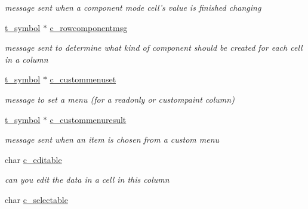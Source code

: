 \begin{DoxyCompactItemize}
\begin{DoxyCompactList}\small\item\em message sent when a component mode cell's value is finished changing \item\end{DoxyCompactList}\item 
\hypertarget{structt__jcolumn_a2c26706beed3f014c420fd774e685dc9}{
\hyperlink{structt__symbol}{t\_\-symbol} $\ast$ \hyperlink{structt__jcolumn_a2c26706beed3f014c420fd774e685dc9}{c\_\-rowcomponentmsg}}
\label{structt__jcolumn_a2c26706beed3f014c420fd774e685dc9}

\begin{DoxyCompactList}\small\item\em message sent to determine what kind of component should be created for each cell in a column \item\end{DoxyCompactList}\item 
\hypertarget{structt__jcolumn_a3650944393f3c4bdb9639866c490e46a}{
\hyperlink{structt__symbol}{t\_\-symbol} $\ast$ \hyperlink{structt__jcolumn_a3650944393f3c4bdb9639866c490e46a}{c\_\-custommenuset}}
\label{structt__jcolumn_a3650944393f3c4bdb9639866c490e46a}

\begin{DoxyCompactList}\small\item\em message to set a menu (for a readonly or custompaint column) \item\end{DoxyCompactList}\item 
\hypertarget{structt__jcolumn_a01ebc99df18e1561ec7fe439a9c43694}{
\hyperlink{structt__symbol}{t\_\-symbol} $\ast$ \hyperlink{structt__jcolumn_a01ebc99df18e1561ec7fe439a9c43694}{c\_\-custommenuresult}}
\label{structt__jcolumn_a01ebc99df18e1561ec7fe439a9c43694}

\begin{DoxyCompactList}\small\item\em message sent when an item is chosen from a custom menu \item\end{DoxyCompactList}\item 
\hypertarget{structt__jcolumn_a293f003e4fbda0dd7c7bbddd4bbff893}{
char \hyperlink{structt__jcolumn_a293f003e4fbda0dd7c7bbddd4bbff893}{c\_\-editable}}
\label{structt__jcolumn_a293f003e4fbda0dd7c7bbddd4bbff893}

\begin{DoxyCompactList}\small\item\em can you edit the data in a cell in this column \item\end{DoxyCompactList}\item 
\hypertarget{structt__jcolumn_a27f5dd1c2138a428788f8545ae54bd3d}{
char \hyperlink{structt__jcolumn_a27f5dd1c2138a428788f8545ae54bd3d}{c\_\-selectable}}
\label{structt__jcolumn_a27f5dd1c2138a428788f8545ae54bd3d}


\end{DoxyCompactItemize}
